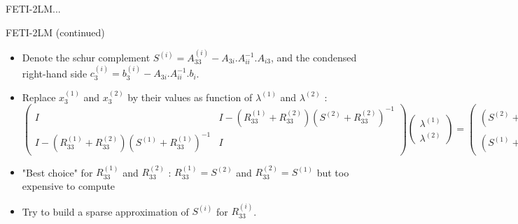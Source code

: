 \documentclass[compress,10pt,aspectratio=169]{beamer}
\begin{document}
\begin{frame}[fragile]{FETI-2LM...}
  \scriptsize
  \begin{block}{FETI-2LM (continued)}
    \begin{itemize}
      \item Denote the schur complement $S^{(i)} = A_{33}^{(i)} - A_{3i}.A_{ii}^{-1}.A_{i3}$, and the condensed right-hand side 
      $c_{3}^{(i)} = b_{3}^{(i)} - A_{3i}.A_{ii}^{-1}.b_{i}$.
      \item Replace $x_{3}^{(1)}$ and $x_{3}^{(2)}$ by their values as function of $\lambda^{(1)}$ and $\lambda^{(2)}$ :
      $
      \left(\begin{array}{cc}
        I & I - (R_{33}^{(1)}+R_{33}^{(2)})(S^{(2)}+R_{33}^{(2)})^{-1} \\
        I - (R_{33}^{(1)}+R_{33}^{(2)})(S^{(1)}+R_{33}^{(1)})^{-1} & I
      \end{array}\right)
      \left(\begin{array}{c}
        \lambda^{(1)} \\ \lambda^{(2)}
      \end{array}\right) = 
      \left(\begin{array}{c}
        (S^{(2)}+R_{33}^{(2)})^{-1}c_{3}^{(2)}\\
        (S^{(1)}+R_{33}^{(1)})^{-1}c_{3}^{(1)}
      \end{array}\right)
      $
      \item "Best choice" for $R_{33}^{(1)}$ and $R_{33}^{(2)}$ : $R_{33}^{(1)} = S^{(2)}$ and $R_{33}^{(2)} = S^{(1)}$ but too expensive to compute
      \item Try to build a sparse approximation of $S^{(i)}$ for $R_{33}^{(i)}$.
    \end{itemize}
  \end{block}
\end{frame}
\end{document}

